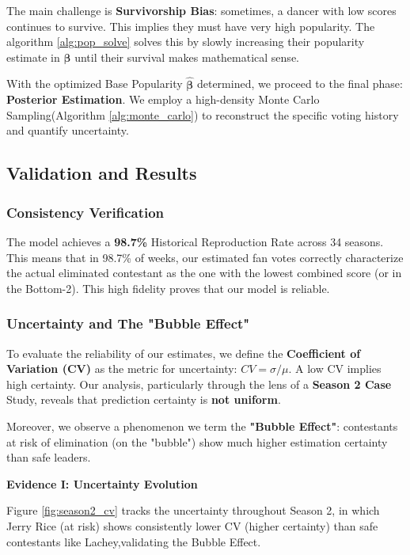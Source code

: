 The main challenge is \textbf{Survivorship Bias}: sometimes, a dancer with low scores continues to survive. This implies they must have very high popularity. The algorithm \ref{alg:pop_solve} solves this by slowly increasing their popularity estimate in $\boldsymbol{\beta}$ until their survival makes mathematical sense.

With the optimized Base Popularity $\hat{\boldsymbol{\beta}}$ determined,
we proceed to the final phase: \textbf{Posterior Estimation}.
We employ a high-density Monte Carlo Sampling(Algorithm \ref{alg:monte_carlo})
to reconstruct the specific voting history and quantify uncertainty.


\subsection{Validation and Results}

\subsubsection{Consistency Verification}
The model achieves a \textbf{98.7\%} Historical Reproduction Rate across 34 seasons.
This means that in 98.7\% of weeks, our estimated fan votes correctly
characterize the actual eliminated contestant as the one with
the lowest combined score (or in the Bottom-2).
This high fidelity proves that our model is reliable.

\subsubsection{Uncertainty and The "Bubble Effect"}

To evaluate the reliability of our estimates,
we define the \textbf{Coefficient of Variation (CV)} as the metric for uncertainty: $CV = \sigma / \mu$.
A low CV implies high certainty. Our analysis,
particularly through the lens of a \textbf{Season 2 Case} Study,
reveals that prediction certainty is \textbf{not uniform}.

Moreover, we observe a phenomenon we term the \textbf{"Bubble Effect"}:
contestants at risk of elimination (on the "bubble")
show much higher estimation certainty than safe leaders.

\textbf{Evidence I: Uncertainty Evolution}

Figure \ref{fig:season2_cv} tracks the uncertainty throughout Season 2, in which Jerry Rice (at risk) shows consistently lower CV (higher certainty) than safe contestants like Lachey,validating the Bubble Effect. 

